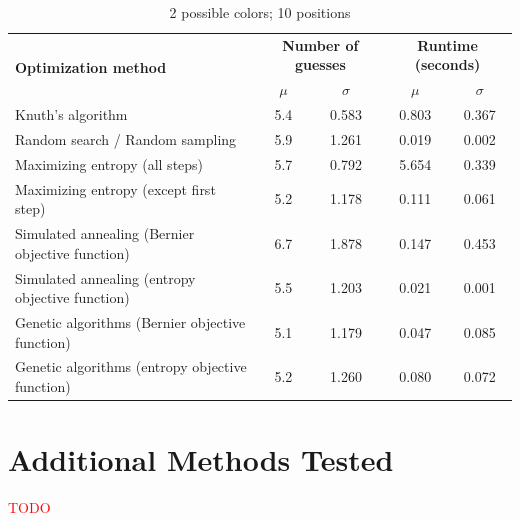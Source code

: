 \documentclass[11pt]{article}
\begin{document}
\begin{table}[h!]
\begin{center}
\begin{tabular}{l c c c c}
\toprule
\multirow{2}{*}{\bfseries Optimization method} 		& \multicolumn{2}{c}{\bfseries Number of guesses} 		& \multicolumn{2}{c}{\bfseries Runtime (seconds)}	\\
\cmidrule(lr){2-3}  \cmidrule(lr){4-5}				& $\mu$ & $\sigma$								& $\mu$ & $\sigma$							\\
\cmidrule(lr){1-5}
Knuth's algorithm							& 5.4 & 0.583									& 0.803 & 0.367							\\
Random search / Random sampling				& 5.9 & 1.261									& 0.019 & 0.002							\\
Maximizing entropy (all steps)					& 5.7 & 0.792									& 5.654 & 0.339							\\
Maximizing entropy (except first step)			& 5.2 & 1.178									& 0.111 & 0.061							\\
Simulated annealing (Bernier objective function)	& 6.7 & 1.878									& 0.147 & 0.453							\\
Simulated annealing (entropy objective function)	& 5.5 & 1.203									& 0.021 & 0.001							\\
Genetic algorithms (Bernier objective function)		& 5.1 & 1.179									& 0.047 & 0.085							\\
Genetic algorithms (entropy objective function)		& 5.2 & 1.260									& 0.080 & 0.072							\\
\bottomrule
\end{tabular}
\end{center}
\caption{2 possible colors; 10 positions}
\label{fig:compare_2_10}
\end{table}

\newpage

\section{Additional Methods Tested}

\noindent \textcolor{red}{TODO}

\newpage
\end{document}
